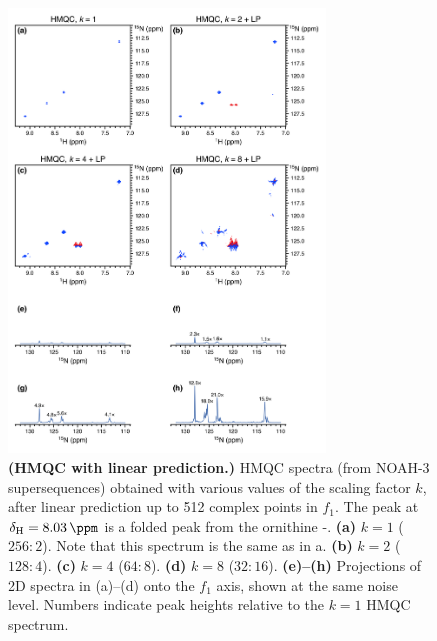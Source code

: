 \begin{figure}
    \centering
    \includegraphics[width=0.75\textwidth]{./figures/hmqc_kscale_lp.png}
    \caption{
        \textbf{(HMQC with linear prediction.)}
        \nitrogen{} HMQC spectra (from NOAH-3  supersequences) obtained with various values of the scaling factor $k$, after linear prediction up to 512 complex points in $f_1$.
        The peak at $\delta_{\ce{H}} = \SI{8.03}{\ppm}$ is a folded peak from the ornithine \textdelta-.
        \textbf{(a)} $k = 1$ ($256:2$). Note that this spectrum is the same as in a.
        \textbf{(b)} $k = 2$ ($128:4$).
        \textbf{(c)} $k = 4$ ($64:8$).
        \textbf{(d)} $k = 8$ ($32:16$).
        \textbf{(e)--(h)} Projections of 2D spectra in (a)--(d) onto the $f_1$ axis, shown at the same noise level.
        Numbers indicate peak heights relative to the $k = 1$ HMQC spectrum.
        \grami{}
    }
    \label{fig:hmqc_kscale_lp}
\end{figure}


